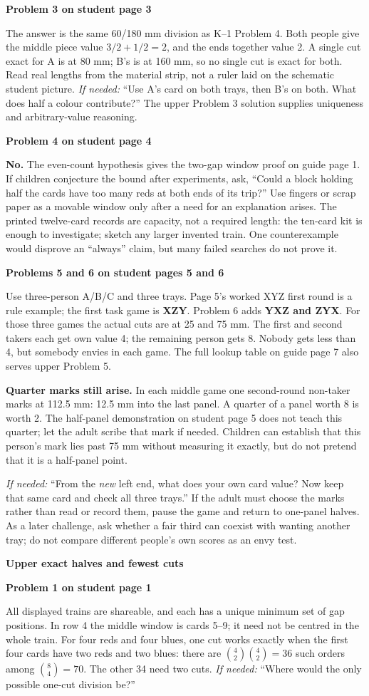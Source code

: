 \documentclass[11pt]{article}
\newcommand{\head}[1]{\par\textbf{\large #1}\par}
\newcommand{\sub}[1]{\par\textbf{#1}\par}
\newcommand{\hint}[1]{\textit{If needed:} #1}
\begin{document}
\sub{Problem 3 on student page 3}
The answer is the same 60/180 mm division as K--1 Problem 4. Both people give the middle piece value $3/2+1/2=2$, and the ends together value 2. A single cut exact for A is at 80 mm; B's is at 160 mm, so no single cut is exact for both. Read real lengths from the material strip, not a ruler laid on the schematic student picture. \hint{``Use A's card on both trays, then B's on both. What does half a colour contribute?''} The upper Problem 3 solution supplies uniqueness and arbitrary-value reasoning.

\sub{Problem 4 on student page 4}
\textbf{No.} The even-count hypothesis gives the two-gap window proof on guide page 1. If children conjecture the bound after experiments, ask, ``Could a block holding half the cards have too many reds at both ends of its trip?'' Use fingers or scrap paper as a movable window only after a need for an explanation arises. The printed twelve-card records are capacity, not a required length: the ten-card kit is enough to investigate; sketch any larger invented train. One counterexample would disprove an ``always'' claim, but many failed searches do not prove it.

\sub{Problems 5 and 6 on student pages 5 and 6}
Use three-person A/B/C and three trays. Page 5's worked XYZ first round is a rule example; the first task game is \textbf{XZY}. Problem 6 adds \textbf{YXZ and ZYX}. For those three games the actual cuts are at 25 and 75 mm. The first and second takers each get own value 4; the remaining person gets 8. Nobody gets less than 4, but somebody envies in each game. The full lookup table on guide page 7 also serves upper Problem 5.

\textbf{Quarter marks still arise.} In each middle game one second-round non-taker marks at 112.5 mm: 12.5 mm into the last panel. A quarter of a panel worth 8 is worth 2. The half-panel demonstration on student page 5 does not teach this quarter; let the adult scribe that mark if needed. Children can establish that this person's mark lies past 75 mm without measuring it exactly, but do not pretend that it is a half-panel point.

\hint{``From the \emph{new} left end, what does your own card value? Now keep that same card and check all three trays.''} If the adult must choose the marks rather than read or record them, pause the game and return to one-panel halves. As a later challenge, ask whether a fair third can coexist with wanting another tray; do not compare different people's own scores as an envy test.
\newpage
\head{Upper exact halves and fewest cuts}
\sub{Problem 1 on student page 1}
\begin{center}\utable\end{center}
All displayed trains are shareable, and each has a unique minimum set of gap positions. In row 4 the middle window is cards 5--9; it need not be centred in the whole train. For four reds and four blues, one cut works exactly when the first four cards have two reds and two blues: there are $\binom42\binom42=36$ such orders among $\binom84=70$. The other 34 need two cuts. \hint{``Where would the only possible one-cut division be?''}
\end{document}
